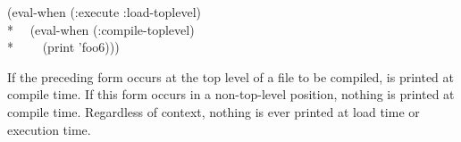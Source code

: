 \begin{newer}
\begin{defspec}
\begin{lisp}
(eval-when (:execute :load-toplevel) \\*
~~(eval-when (:compile-toplevel) \\*
~~~~(print 'foo6)))
\end{lisp}

    If the preceding form occurs at the top level of a file to be compiled,
        is
       printed at compile time.  If this form occurs in a non-top-level
       position, nothing is printed at compile time. Regardless of context,
       nothing is ever printed at load time or execution time.
\end{defspec}
\end{newer}